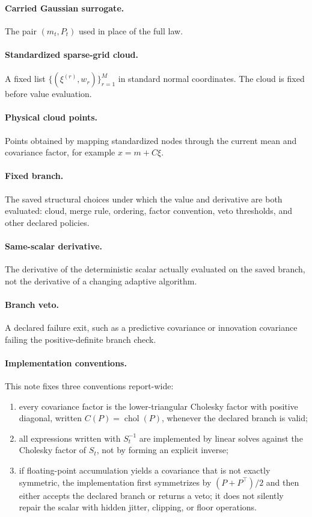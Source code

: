 \documentclass[11pt]{article}
\numberwithin{equation}{section}
\newcommand{\chol}{\operatorname{chol}}
\begin{document}
\paragraph{Carried Gaussian surrogate.}
The pair \((m_t,P_t)\) used in place of the full law.

\paragraph{Standardized sparse-grid cloud.}
A fixed list \(\{(\xi^{(r)},w_r)\}_{r=1}^M\) in standard normal coordinates.
The cloud is fixed before value evaluation.

\paragraph{Physical cloud points.}
Points obtained by mapping standardized nodes through the current mean and
covariance factor, for example \(x=m+C\xi\).

\paragraph{Fixed branch.}
The saved structural choices under which the value and derivative are both
evaluated: cloud, merge rule, ordering, factor convention, veto thresholds, and
other declared policies.

\paragraph{Same-scalar derivative.}
The derivative of the deterministic scalar actually evaluated on the saved
branch, not the derivative of a changing adaptive algorithm.

\paragraph{Branch veto.}
A declared failure exit, such as a predictive covariance or innovation
covariance failing the positive-definite branch check.

\paragraph{Implementation conventions.}
This note fixes three conventions report-wide:
\begin{enumerate}[leftmargin=0.3in]
  \item every covariance factor is the lower-triangular Cholesky factor with
  positive diagonal, written \(C(P)=\chol(P)\), whenever the declared branch is
  valid;
  \item all expressions written with \(S_t^{-1}\) are implemented by linear
  solves against the Cholesky factor of \(S_t\), not by forming an explicit
  inverse;
  \item if floating-point accumulation yields a covariance that is not exactly
  symmetric, the implementation first symmetrizes by
  \((P+P^\top)/2\) and then either accepts the declared branch or returns a veto;
  it does not silently repair the scalar with hidden jitter, clipping, or floor
  operations.
\end{enumerate}
\end{document}
